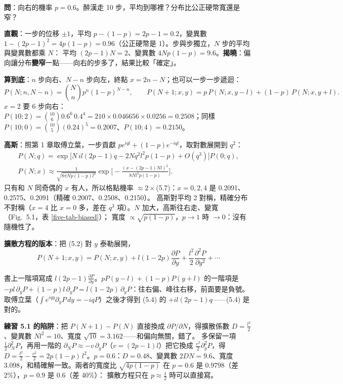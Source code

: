 \textbf{問}：向右的機率 $p=0.6$。醉漢走 10 步，平均到哪裡？分布比公正硬幣寬還是窄？

\textbf{直觀}：一步的位移 $\pm1$，平均 $p-(1-p)=2p-1=0.2$，變異數 $1-(2p-1)^2=4p(1-p)=0.96$（公正硬幣是 1）。步與步獨立，$N$ 步的平均與變異數都乘 $N$：
平均 $(2p-1)N=2$、變異數 $4Np(1-p)=9.6$。\textbf{揭曉}：偏向讓分布\textbf{變窄}一點——向右的步多了，結果比較「確定」。

\textbf{算到底}：$n$ 步向右、$N-n$ 步向左，終點 $x=2n-N$；也可以一步一步遞迴：
\[P(N;n,N-n)=\binom Nn p^n(1-p)^{N-n},\qquad P(N+1;x,y)=p\,P(N;x,y-l)+(1-p)\,P(N;x,y+l).\tag{5.1, 5.2}\]
$x=2$ 要 6 步向右：$P(10;2)=\binom{10}{6}0.6^6\,0.4^4=210\times0.046656\times0.0256=0.2508$；同樣 $P(10;0)=\binom{10}{5}(0.24)^5=0.2007$、$P(10;4)=0.2150$。

\textbf{高斯}：照第 1 章取傅立葉，一步貢獻 $pe^{iql}+(1-p)e^{-iql}$，取對數展開到 $q^2$：
\begin{gather*}
P(N;q)=\exp\big[N\,il(2p-1)q-2Nq^2l^2p(1-p)+O(q^3)\big]P(0;q),\tag{5.5c}\\
P(N;x)\approx\frac{1}{\sqrt{8\pi Np(1-p)l^2}}\exp\Big[-\frac{(x-(2p-1)Nl)^2}{8Nl^2p(1-p)}\Big].\tag{5.7}
\end{gather*}
只有和 $N$ 同奇偶的 $x$ 有人，所以格點機率 $\approx2\times$(5.7)：$x=0,2,4$ 是 0.2091、0.2575、0.2091（精確 0.2007、0.2508、0.2150）。
高斯對平均 2 對稱，精確分布不對稱（$x=4$ 比 $x=0$ 多，差在 $q^3$ 項）。$N$ 加大，高斯往右走、變寬（Fig.~5.1，表 \ref{five-tab-biased}）；
寬度 $\propto\sqrt{p(1-p)}$，$p\to1$ 時 $\to0$：沒有隨機性了。

\begin{table}[htbp]
\centering
\small
\FiveTabBiased
\caption{不公正的硬幣 $p=0.6$。左：$N=10$ 的精確值與 $2\times$ 高斯；右：Fig.~5.1 的三組，平均與變異數都和 $N$ 成正比，峰值約除以 $\sqrt2$}\label{five-tab-biased}
\end{table}

\textbf{擴散方程的版本}：把 (5.2) 對 $y$ 泰勒展開，
\[P(N+1;x,y)=P(N;x,y)+l(1-2p)\frac{\partial P}{\partial y}+\frac{l^2}{2}\frac{\partial^2P}{\partial y^2}+\cdots\tag{5.3}\]
\begin{errbox}[p.~96，(5.3)]
書上一階項寫成 $l(2p-1)\frac{\partial P}{\partial y}$。$pP(y-l)+(1-p)P(y+l)$ 的一階項是 $-pl\,\partial_yP+(1-p)l\,\partial_yP=l(1-2p)\,\partial_yP$：往右偏、峰往右移，前面要是負號。
取傅立葉（$\int e^{iqy}\partial_yP\,dy=-iqP$）之後才得到 (5.4) 的 $+il(2p-1)q$——(5.4) 是對的。
\end{errbox}

\textbf{練習 5.1 的陷阱}：把 $P(N+1)-P(N)$ 直接換成 $\partial P/\partial N$，得擴散係數 $D=\frac{l^2}2$、變異數 $Nl^2=10$、寬度 $\sqrt{10}=3.162$——和偏向無關，錯了。
多保留一項 $\frac12\partial_N^2P$，再用一階的 $\partial_NP\approx-v\,\partial_yP$（$v=(2p-1)l$）把它換成 $\frac{v^2}2\partial_y^2P$，得
$D=\frac{l^2}{2}-\frac{v^2}{2}=2p(1-p)\,l^2$。$p=0.6$：$D=0.48$、變異數 $2DN=9.6$、寬度 3.098，和精確解一致。兩者的寬度比 $\sqrt{4p(1-p)}$ 在 $p=0.6$ 是 0.9798（差 2\%），$p=0.9$ 是 0.6（差 40\%）：
擴散方程只在 $p\approx\frac12$ 時可以直接寫。

